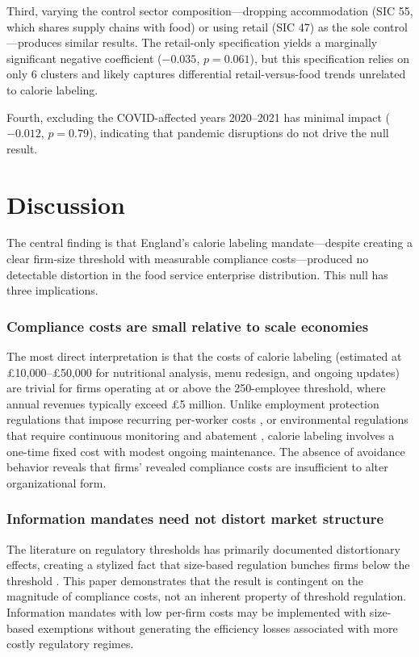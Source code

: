 \documentclass[12pt]{article}
\begin{document}
Third, varying the control sector composition---dropping accommodation (SIC 55, which shares supply chains with food) or using retail (SIC 47) as the sole control---produces similar results. The retail-only specification yields a marginally significant negative coefficient ($-0.035$, $p = 0.061$), but this specification relies on only 6 clusters and likely captures differential retail-versus-food trends unrelated to calorie labeling.

Fourth, excluding the COVID-affected years 2020--2021 has minimal impact ($-0.012$, $p = 0.79$), indicating that pandemic disruptions do not drive the null result.


\section{Discussion}
\label{sec:discussion}

The central finding is that England's calorie labeling mandate---despite creating a clear firm-size threshold with measurable compliance costs---produced no detectable distortion in the food service enterprise distribution. This null has three implications.

\subsubsection*{Compliance costs are small relative to scale economies} The most direct interpretation is that the costs of calorie labeling (estimated at \pounds10,000--\pounds50,000 for nutritional analysis, menu redesign, and ongoing updates) are trivial for firms operating at or above the 250-employee threshold, where annual revenues typically exceed \pounds5 million. Unlike employment protection regulations that impose recurring per-worker costs \citep{garibaldi2004anatomy, ceci2012regulatory}, or environmental regulations that require continuous monitoring and abatement \citep{bento2018effect}, calorie labeling involves a one-time fixed cost with modest ongoing maintenance. The absence of avoidance behavior reveals that firms' revealed compliance costs are insufficient to alter organizational form.

\subsubsection*{Information mandates need not distort market structure} The literature on regulatory thresholds has primarily documented distortionary effects, creating a stylized fact that size-based regulation bunches firms below the threshold \citep{garicano2016firm, hsieh2014life}. This paper demonstrates that the result is contingent on the magnitude of compliance costs, not an inherent property of threshold regulation. Information mandates with low per-firm costs may be implemented with size-based exemptions without generating the efficiency losses associated with more costly regulatory regimes.
\end{document}
